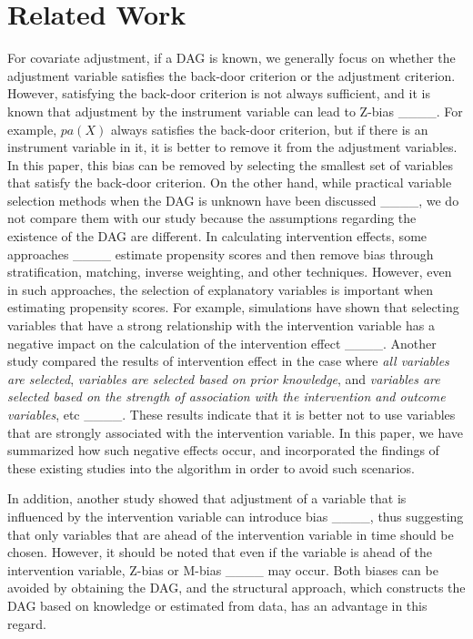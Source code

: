 \section{Related Work}
For covariate adjustment, if a DAG is known, we generally focus on whether the adjustment variable satisfies the back-door criterion or the adjustment criterion. However, satisfying the back-door criterion is not always sufficient, and it is known that adjustment by the instrument variable can lead to Z-bias ____. For example, $pa(X)$ always satisfies the back-door criterion, but if there is an instrument variable in it, it is better to remove it from the adjustment variables. In this paper, this bias can be removed by selecting the smallest set of variables that satisfy the back-door criterion. On the other hand, while practical variable selection methods when the DAG is unknown have been discussed ____, we do not compare them with our study because the assumptions regarding the existence of the DAG are different. In calculating intervention effects, some approaches ____ estimate propensity scores and then remove bias through stratification, matching, inverse weighting, and other techniques. However, even in such approaches, the selection of explanatory variables is important when estimating propensity scores. For example, simulations have shown that selecting variables that have a strong relationship with the intervention variable has a negative impact on the calculation of the intervention effect ____. Another study compared the results of intervention effect in the case where \textit{all variables are selected}, \textit{variables are selected based on prior knowledge}, and \textit{variables are selected based on the strength of association with the intervention and outcome variables}, etc ____. These results indicate that it is better not to use variables that are strongly associated with the intervention variable. In this paper, we have summarized how such negative effects occur, and incorporated the findings of these existing studies into the algorithm in order to avoid such scenarios.

In addition, another study showed that adjustment of a variable that is influenced by the intervention variable can introduce bias ____, thus suggesting that only variables that are ahead of the intervention variable in time should be chosen. However, it should be noted that even if the variable is ahead of the intervention variable, Z-bias or M-bias ____ may occur. Both biases can be avoided by obtaining the DAG, and the structural approach, which constructs the DAG based on knowledge or estimated from data, has an advantage in this regard.

